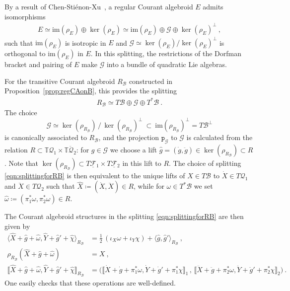\documentclass[a4paper, reqno, 11pt]{amsart}
\numberwithin{equation}{section}
\theoremstyle{definition}
\newcommand{\cbrak}[1]{\llbracket #1 \rrbracket}
\newcommand{\ip}[1]{\langle #1 \rangle}
\newcommand{\red}[1]{\underline{#1}}
\newcommand{\rmp}{\mathtt{p}}
\newcommand{\IT}{\mathbb{T}}
\renewcommand{\Im}{\ensuremath{\mathrm{im}}}
\newcommand{\cB}{{\mathcal B}}
\newcommand{\cQ}{{\mathcal Q}}
\newcommand{\cF}{{\mathcal F}}
\newcommand{\ccG}{{\mathscr G}}
\theoremstyle{remark}
\begin{document}
By a result of Chen-Sti\'enon-Xu~\cite[Lemma 1.2]{Chen2013}, a regular Courant algebroid $E$ admits  isomorphisms
\begin{align}
    E \simeq \Im(\rho_E) \oplus \ker(\rho_E) \simeq \Im(\rho_E)\oplus \ccG \oplus \ker (\rho_E)^\perp \ ,
\end{align}
such that $\Im(\rho_E)$ is isotropic in $E$ and $\ccG\simeq\ker(\rho_E)/\ker(\rho_E)^\perp$ is orthogonal to $\Im(\rho_E)$ in $E$. In this splitting, the restrictions of the Dorfman bracket and pairing of $E$ make $\ccG$ into a bundle of quadratic Lie algebras.

For the transitive Courant algebroid $R_\cB$ constructed in Proposition~\ref{prop:regCAonB}, this provides the splitting
\begin{align}\label{eqn:splittingforRB}
    R_\cB \simeq T\cB \oplus \ccG \oplus T^*\cB \ .
\end{align}
The choice $$\ccG\simeq\ker(\rho_{R_\cB})\,\big/\,\ker(\rho_{R_\cB})^\perp \ \subset \ \Im(\rho_{R_\cB})^\perp=T\cB^\perp$$  is canonically associated to $R_\cB$, and the projection $\rmp_\ccG$ to $\ccG$ is calculated from the relation $R\subset\IT\cQ_1\times\overline{\IT\cQ_2}$: for $g\in \ccG$ we choose a lift $\widehat g=(\dot g,\ddot g)\in\ker(\rho_{R_\cB})\subset R$. Note that $\ker(\rho_{R_\cB})\subset T\red\cF{}_1\times T\red\cF{}_2$ in this lift to $R$. The choice of splitting \eqref{eqn:splittingforRB} is then equivalent to the unique lifts of $X\in T\cB$ to $\dot X \in T\cQ_1$ and $\ddot X \in T\cQ_2$ such that $\widehat X\coloneqq(\dot X, \ddot X) \in R$, while for $\omega\in T^*\cB$ we set $\widehat\omega \coloneqq (\pi_1^*\omega, \pi_2^* \omega)\in R$. 

The Courant algebroid structures in the splitting \eqref{eqn:splittingforRB} are then given by
\begin{align}
    \ip{\widehat X + \widehat g + \widehat\omega, \widehat Y + \widehat g' + \widehat\chi}_{R_\cB} &= \tfrac 12\,(\iota_X \omega + \iota_Y \chi) + \ip{\widehat g,\widehat g'}_{R_\cB} \  , \\[4pt]
    \rho_{R_\cB}(\widehat X + \widehat g + \widehat\omega) &= X \ , \\[4pt]
    \cbrak{\widehat X + \widehat g + \widehat\omega, \widehat Y + \widehat g' + \widehat \chi}_{R_\cB} &=\big(\cbrak{\dot X + \dot g + \pi_1^* \omega, \dot Y + \dot g' + \pi_1^* \chi}_1\,,\,\cbrak{\ddot X + \ddot g + \pi_2^* \omega, \ddot Y + \ddot g' + \pi_2^* \chi}_2\big) \ .
\end{align}
One easily checks that these operations are well-defined.
\end{document}
